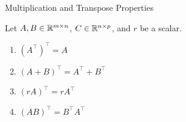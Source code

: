 \documentclass[xcoler=dvipsnames, aspectratio=169]{beamer}
\begin{document}
    \begin{frame}{Multiplication and Transpose Properties}
        \begin{tcolorbox}
            Let $A,B\in\mathbb{R}^{m\times n}$, $C\in\mathbb{R}^{n\times p}$, and $r$ be a scalar.
            \begin{enumerate}
                \item $\left(A^\top\right)^\top = A$\pause
                \item $(A+B)^\top = A^\top + B^\top$\pause
                \item $(rA)^\top = rA^\top$\pause
                \item $(AB)^\top = B^\top A^\top$
            \end{enumerate}
        \end{tcolorbox}
    \end{frame}
\end{document}
